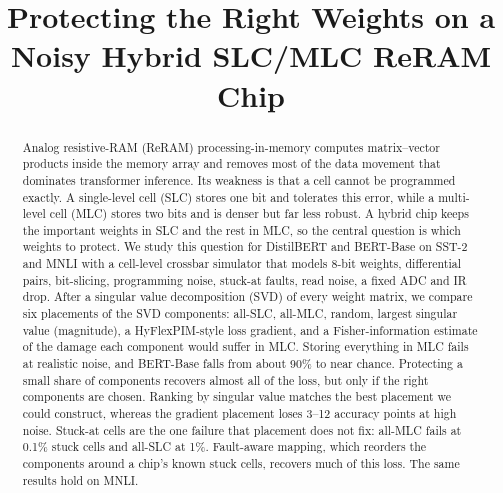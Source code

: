 \documentclass[conference]{IEEEtran}
\begin{document}
\title{Protecting the Right Weights on a Noisy Hybrid SLC/MLC ReRAM Chip}

\author{
\and
{}
}

\maketitle

\begin{abstract}
Analog resistive-RAM (ReRAM) processing-in-memory computes matrix--vector products inside the memory
array and removes most of the data movement that dominates transformer inference. Its weakness is that
a cell cannot be programmed exactly. A single-level cell (SLC) stores one bit and tolerates this error,
while a multi-level cell (MLC) stores two bits and is denser but far less robust. A hybrid chip keeps
the important weights in SLC and the rest in MLC, so the central question is which weights to protect.
We study this question for DistilBERT and BERT-Base on SST-2 and MNLI with a cell-level crossbar simulator that
models 8-bit weights, differential pairs, bit-slicing, programming noise, stuck-at faults, read noise,
a fixed ADC and IR drop. After a singular value decomposition (SVD) of every weight matrix, we compare
six placements of the SVD components: all-SLC, all-MLC, random, largest singular value (magnitude),
a HyFlexPIM-style loss gradient, and a Fisher-information estimate of the damage each component would
suffer in MLC. Storing everything in MLC fails at realistic noise, and BERT-Base falls from about 90\% to
near chance. Protecting a small share of components recovers almost all of the loss, but only if the right
components are chosen. Ranking by singular value matches the best placement we could construct,
whereas the gradient placement loses 3--12 accuracy points at high noise. Stuck-at cells are the one
failure that placement does not fix: all-MLC fails at 0.1\% stuck cells and all-SLC at 1\%. Fault-aware
mapping, which reorders the components around a chip's known stuck cells, recovers much of this loss. The
same results hold on MNLI.
\end{abstract}
\end{document}
